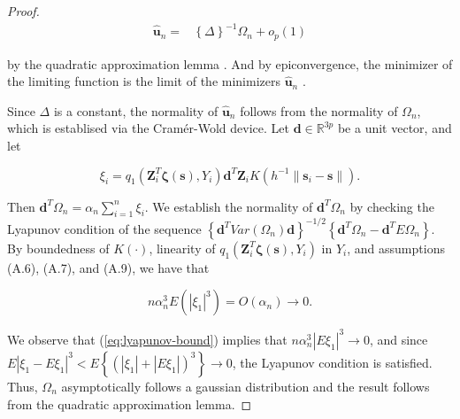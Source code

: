 \documentclass[12pt,english,authoryear, review]{article}\usepackage[]{graphicx}\usepackage[]{color}
\theoremstyle{plain}
\theoremstyle{plain}
\begin{document}
\begin{proof}
\begin{align*}
\hat{\bm{u}}_{n}= & \left\{ \Delta\right\} ^{-1}\Omega_{n}+o_{p}\left(1\right)
\end{align*}


by the quadratic approximation lemma \citep{Fan-Gijbels-1996}. And
by epiconvergence, the minimizer of the limiting function is the limit
of the minimizers $\hat{\bm{u}}_{n}$ \citep{Geyer-1994,Knight-Fu-2000}.

Since $\Delta$ is a constant, the normality of $\hat{\bm{u}}_{n}$
follows from the normality of $\Omega_{n}$, which is establised via
the Cram\'{e}r-Wold device. Let $\bm{d}\in\mathbb{R}^{3p}$ be a
unit vector, and let

\[
\xi_{i}=q_{1}\left(\bm{Z}_{i}^{T}\bm{\zeta}\left(\bm{s}\right),Y_{i}\right)\bm{d}^{T}\bm{Z}_{i}K\left(h^{-1}\|\bm{s}_{i}-\bm{s}\|\right).
\]


Then $\bm{d}^{T}\Omega_{n}=\alpha_{n}\sum_{i=1}^{n}\xi_{i}$. We establish
the normality of $\bm{d}^{T}\Omega_{n}$ by checking the Lyapunov
condition of the sequence $\left\{ \bm{d}^{T}Var\left(\Omega_{n}\right)\bm{d}\right\} ^{-1/2}\left\{ \bm{d}^{T}\Omega_{n}-\bm{d}^{T}E\Omega_{n}\right\} $.
By boundedness of $K\left(\cdot\right)$, linearity of $q_{1}\left(\bm{Z}_{i}^{T}\bm{\zeta}\left(\bm{s}\right),Y_{i}\right)$
in $Y_{i}$, and assumptions (A.6), (A.7), and (A.9), we have that

\begin{equation}
n\alpha_{n}^{3}E\left(\left|\xi_{1}\right|^{3}\right)=O\left(\alpha_{n}\right)\to0.\label{eq:lyapunov-bound}
\end{equation}


We observe that (\ref{eq:lyapunov-bound}) implies that $n\alpha_{n}^{3}\left|E\xi_{1}\right|^{3}\to0$,
and since $E\left|\xi_{1}-E\xi_{1}\right|^{3}<E\left\{ \left(\left|\xi_{1}\right|+\left|E\xi_{1}\right|\right)^{3}\right\} \to0$,
the Lyapunov condition is satisfied. Thus, $\Omega_{n}$ asymptotically
follows a gaussian distribution and the result follows from the quadratic
approximation lemma.
\end{proof}
\end{document}
